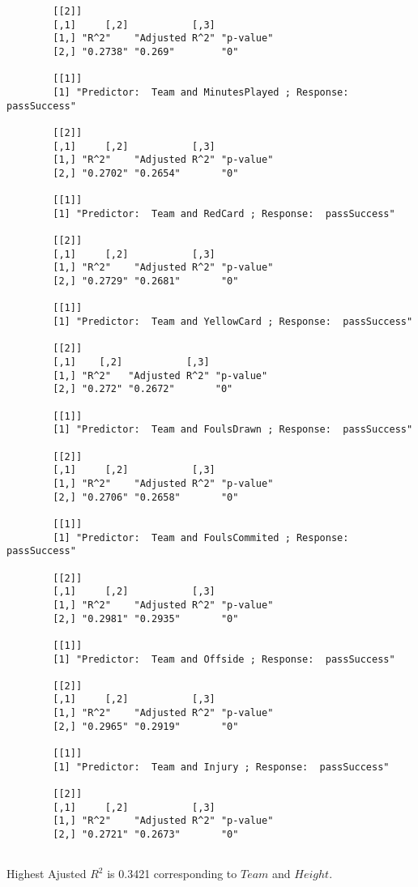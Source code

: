 \documentclass[12pt]{article}
\begin{document}
\begin{verbatim}
		[[2]]
		[,1]     [,2]           [,3]     
		[1,] "R^2"    "Adjusted R^2" "p-value"
		[2,] "0.2738" "0.269"        "0"      
		
		[[1]]
		[1] "Predictor:  Team and MinutesPlayed ; Response:  passSuccess"
		
		[[2]]
		[,1]     [,2]           [,3]     
		[1,] "R^2"    "Adjusted R^2" "p-value"
		[2,] "0.2702" "0.2654"       "0"      
		
		[[1]]
		[1] "Predictor:  Team and RedCard ; Response:  passSuccess"
		
		[[2]]
		[,1]     [,2]           [,3]     
		[1,] "R^2"    "Adjusted R^2" "p-value"
		[2,] "0.2729" "0.2681"       "0"      
		
		[[1]]
		[1] "Predictor:  Team and YellowCard ; Response:  passSuccess"
		
		[[2]]
		[,1]    [,2]           [,3]     
		[1,] "R^2"   "Adjusted R^2" "p-value"
		[2,] "0.272" "0.2672"       "0"      
		
		[[1]]
		[1] "Predictor:  Team and FoulsDrawn ; Response:  passSuccess"
		
		[[2]]
		[,1]     [,2]           [,3]     
		[1,] "R^2"    "Adjusted R^2" "p-value"
		[2,] "0.2706" "0.2658"       "0"      
		
		[[1]]
		[1] "Predictor:  Team and FoulsCommited ; Response:  passSuccess"
		
		[[2]]
		[,1]     [,2]           [,3]     
		[1,] "R^2"    "Adjusted R^2" "p-value"
		[2,] "0.2981" "0.2935"       "0"      
		
		[[1]]
		[1] "Predictor:  Team and Offside ; Response:  passSuccess"
		
		[[2]]
		[,1]     [,2]           [,3]     
		[1,] "R^2"    "Adjusted R^2" "p-value"
		[2,] "0.2965" "0.2919"       "0"      
		
		[[1]]
		[1] "Predictor:  Team and Injury ; Response:  passSuccess"
		
		[[2]]
		[,1]     [,2]           [,3]     
		[1,] "R^2"    "Adjusted R^2" "p-value"
		[2,] "0.2721" "0.2673"       "0"   
		
	\end{verbatim}
	Highest Ajusted $ R^2 $ is 0.3421 corresponding to $ Team $ and $ Height $.
	
\end{document}
